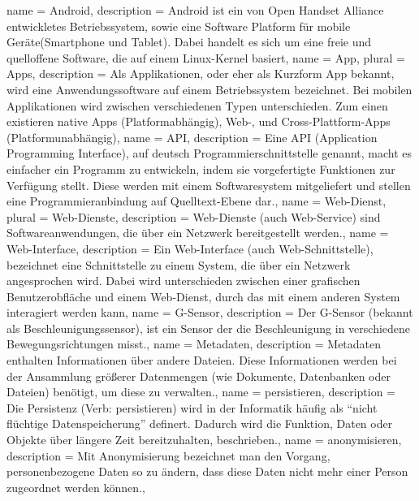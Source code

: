\newpage
\printglossaries
{}
{
  name = Android,
  description = {Android ist ein von Open Handset Alliance entwickletes Betriebssystem, sowie eine Software Platform für mobile Geräte(\gls{Smartphone} und \gls{Tablet}). Dabei handelt es sich um eine freie und quelloffene Software, die auf einem Linux-Kernel basiert},
}
{
  name = App,
  plural = Apps,
  description = {Als Applikationen, oder eher als Kurzform App bekannt, wird eine Anwendungssoftware auf einem Betriebssystem bezeichnet. Bei mobilen Applikationen wird zwischen verschiedenen Typen unterschieden. Zum einen existieren native Apps (Platformabhängig), Web-, und Cross-Plattform-Apps (Platformunabhängig)},
}
{
  name = API,
  description = {Eine API (Application Programming Interface), auf deutsch Programmierschnittstelle genannt, macht es einfacher ein Programm zu entwickeln, indem sie vorgefertigte Funktionen zur Verfügung stellt. Diese werden mit einem Softwaresystem mitgeliefert und stellen eine Programmieranbindung auf Quelltext-Ebene dar.},
}
{
  name = Web-Dienst,
  plural = Web-Dienste,
  description = {Web-Dienste (auch Web-Service) sind Softwareanwendungen, die über ein Netzwerk bereitgestellt werden.},
}
{
  name = Web-Interface,
  description = {Ein Web-Interface (auch Web-Schnittstelle), bezeichnet eine Schnittstelle zu einem System, die über ein Netzwerk angesprochen wird. Dabei wird unterschieden zwischen einer grafischen Benutzerobfläche und einem \gls{Web-Dienst}, durch das mit einem anderen System interagiert werden kann},
}
{
  name = G-Sensor,
  description = {Der G-Sensor (bekannt als Beschleunigungssensor), ist ein Sensor der die Beschleunigung in verschiedene Bewegungsrichtungen misst.},
}
{
  name = Metadaten,
  description = {Metadaten enthalten Informationen über andere Dateien. Diese Informationen werden bei der Ansammlung größerer Datenmengen (wie Dokumente, Datenbanken oder Dateien) benötigt, um diese zu verwalten.},
}
{
  name = persistieren,
  description = {Die Persistenz (Verb: persistieren) wird in der Informatik häufig als ``nicht flüchtige Datenspeicherung'' definert. Dadurch wird die Funktion, Daten oder Objekte über längere Zeit bereitzuhalten, beschrieben.},
}
{
  name = anonymisieren,
  description = {Mit Anonymisierung bezeichnet man den Vorgang, personenbezogene Daten so zu ändern, dass diese Daten nicht mehr einer Person zugeordnet werden können.},
}
